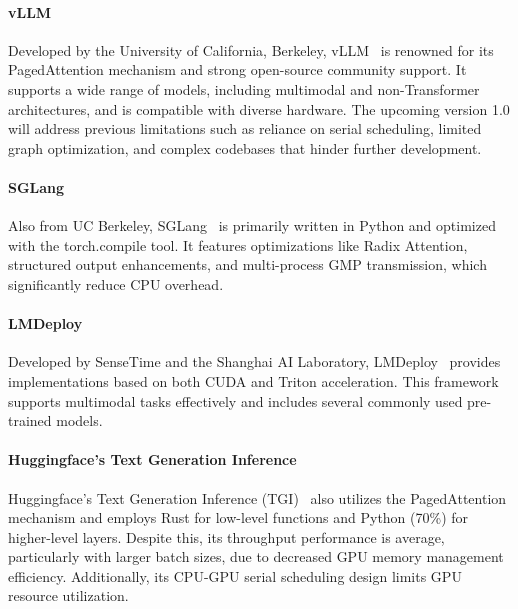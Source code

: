 
\paragraph{vLLM} 
Developed by the University of California, Berkeley, vLLM~\citep{kwon2023efficient} is renowned for its PagedAttention mechanism and strong open-source community support. It supports a wide range of models, including multimodal and non-Transformer architectures, and is compatible with diverse hardware. The upcoming version 1.0 will address previous limitations such as reliance on serial scheduling, limited graph optimization, and complex codebases that hinder further development.

\paragraph{SGLang}
Also from UC Berkeley, SGLang~\citep{zheng2024sglang} is primarily written in Python and optimized with the torch.compile tool. It features optimizations like Radix Attention, structured output enhancements, and multi-process GMP transmission, which significantly reduce CPU overhead.

\paragraph{LMDeploy}
Developed by SenseTime and the Shanghai AI Laboratory, LMDeploy~\citep{2023lmdeploy} provides implementations based on both CUDA and Triton acceleration. This framework supports multimodal tasks effectively and includes several commonly used pre-trained models.

\paragraph{Huggingface's Text Generation Inference}
Huggingface's Text Generation Inference (TGI)~\citep{huggingface2024huggingfaceTGI} also utilizes the PagedAttention mechanism and employs Rust for low-level functions and Python (70\%) for higher-level layers. Despite this, its throughput performance is average, particularly with larger batch sizes, due to decreased GPU memory management efficiency. Additionally, its CPU-GPU serial scheduling design limits GPU resource utilization.

